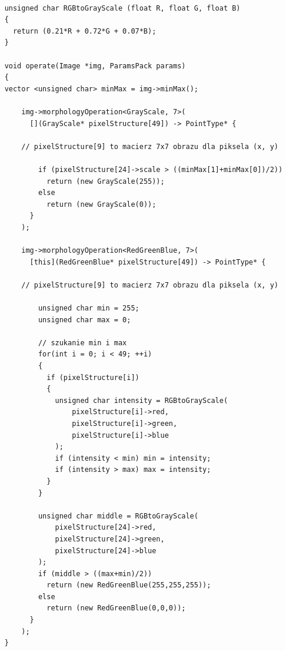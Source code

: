 \documentclass{article}
\begin{document}
\begin{Verbatim}[frame=single,label=Progowanie Lokalne (Source Code)]

    unsigned char RGBtoGrayScale (float R, float G, float B)
    {
      return (0.21*R + 0.72*G + 0.07*B);
    }

    void operate(Image *img, ParamsPack params)
    {
	vector <unsigned char> minMax = img->minMax();    
    
        img->morphologyOperation<GrayScale, 7>(
          [](GrayScale* pixelStructure[49]) -> PointType* {
	
		// pixelStructure[9] to macierz 7x7 obrazu dla piksela (x, y)		

            if (pixelStructure[24]->scale > ((minMax[1]+minMax[0])/2))
              return (new GrayScale(255));
            else
              return (new GrayScale(0));
          }
        );

        img->morphologyOperation<RedGreenBlue, 7>(
          [this](RedGreenBlue* pixelStructure[49]) -> PointType* {
			
		// pixelStructure[9] to macierz 7x7 obrazu dla piksela (x, y)			
			
            unsigned char min = 255;
            unsigned char max = 0;
			
			// szukanie min i max
            for(int i = 0; i < 49; ++i)
            {
              if (pixelStructure[i])
              {
                unsigned char intensity = RGBtoGrayScale(
                	pixelStructure[i]->red, 
                	pixelStructure[i]->green, 
                	pixelStructure[i]->blue
                );
                if (intensity < min) min = intensity;
                if (intensity > max) max = intensity;
              }
            }     
            
            unsigned char middle = RGBtoGrayScale(
           		pixelStructure[24]->red, 
            	pixelStructure[24]->green, 
            	pixelStructure[24]->blue
            );
            if (middle > ((max+min)/2))
              return (new RedGreenBlue(255,255,255));
            else
              return (new RedGreenBlue(0,0,0));
          }
        );
    }

\end{Verbatim}
\end{document}
